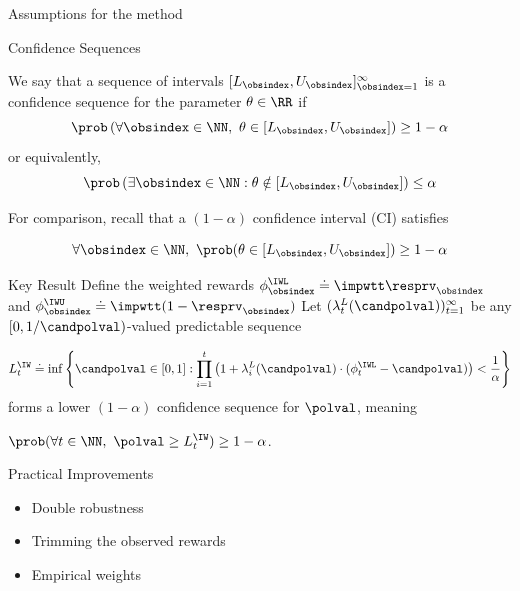 \documentclass[aspectratio=169, professionalfonts]{beamer}
\begin{document}
\begin{frame}{Assumptions for the method}
\end{frame}

\begin{frame}{Confidence Sequences}
	\begin{definition}
		We say that a sequence of intervals $[L_\obsindex, U_\obsindex]_{\obsindex=1}^\infty$ is a confidence sequence for the parameter $\theta \in \RR$ if
		\begin{equation*}\label{eq:cs}
			\prob \left ( \forall \obsindex \in \NN,\ \theta \in [L_\obsindex, U_\obsindex] \right ) \geq 1-\alpha \end{equation*}
		or equivalently,
		\begin{equation*}
			\prob \left ( \exists \obsindex \in \NN : \theta \notin [L_\obsindex, U_\obsindex] \right ) \leq \alpha
		\end{equation*}
	\end{definition}

	\vfill \pause
	For comparison, recall that a $(1- \alpha)$ confidence interval (CI) satisfies

	$$\forall \obsindex \in \NN,\ \prob(\theta \in [L_\obsindex, U_\obsindex]) \geq 1-\alpha$$
\end{frame}

\begin{frame}{Key Result}
	Define the weighted rewards $\phi_\obsindex^\IWL \doteq \impwtt \resprv_\obsindex$ and $\phi_\obsindex^\IWU \doteq
		\impwtt(1-\resprv_\obsindex)$
	\vfill
	Let   $(\lambda_t^L(\candpolval))_{t=1}^\infty$ be any $[0, 1/\candpolval)$-valued
	predictable sequence

	\vfill
	\begin{equation}\label{eq:kmr-cs}
		L_t^\IW \doteq \inf\left \{ \candpolval \in [0, 1] : \prod_{i=1}^t \left ( 1 + \lambda_i^L(\candpolval) \cdot (\phi_t^\IWL - \candpolval) \right ) < \frac{1}{\alpha} \right \}
	\end{equation}
	forms a lower $(1-\alpha)$ confidence sequence for $\polval$, meaning

	$\prob(\forall t \in \NN,\ \polval \geq L_t^\IW) \geq 1-\alpha$.
\end{frame}

\begin{frame}{Practical Improvements}
	\begin{itemize}
		\item Double robustness
		\item Trimming the observed rewards
		\item Empirical weights
	\end{itemize}
\end{frame}
\end{document}
